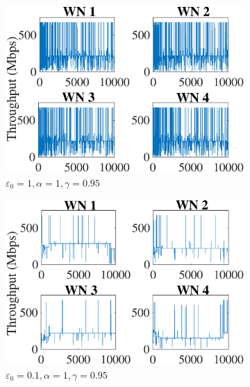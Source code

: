 \documentclass[conference]{IEEEtran}
\begin{document}
	\begin{figure}[h!]
		\centering
		\begin{subfigure}[b]{0.225\textwidth}
			\includegraphics[width=\textwidth]{images/e_1_a1_g095_ind_tpt}
			\caption{$\varepsilon_0=1, \alpha=1, \gamma=0.95$}
			\label{fig:e_1_a1_g095_ind_tpt}
		\end{subfigure}
		\begin{subfigure}[b]{0.225\textwidth}
			\includegraphics[width=\textwidth]{images/e_01_a_1_g_095_ind_tpt}
			\caption{$\varepsilon_0=0.1, \alpha=1, \gamma=0.95$}
			\label{fig:e_1_a_1_g_095_ind_tpt}
		\end{subfigure}
		\begin{subfigure}[b]{0.225\textwidth}

\end{subfigure}
\end{figure}
\end{document}
